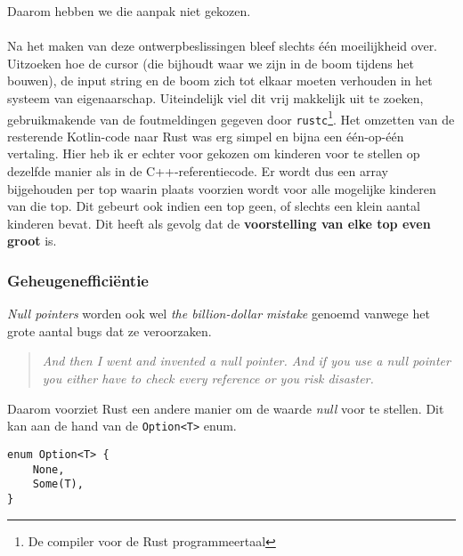 Daarom hebben we die aanpak niet gekozen.
\\ \\
Na het maken van deze ontwerpbeslissingen bleef slechts één moeilijkheid over.
Uitzoeken hoe de cursor (die bijhoudt waar we zijn in de boom tijdens het bouwen), de input string en de boom zich tot elkaar moeten verhouden in het systeem van eigenaarschap.
Uiteindelijk viel dit vrij makkelijk uit te zoeken, gebruikmakende van de foutmeldingen gegeven door \texttt{rustc}\footnote{De compiler voor de Rust programmeertaal}.
Het omzetten van de resterende Kotlin-code naar Rust was erg simpel en bijna een één-op-één vertaling.
Hier heb ik er echter voor gekozen om kinderen voor te stellen op dezelfde manier als in de C++-referentiecode.
Er wordt dus een array bijgehouden per top waarin plaats voorzien wordt voor alle mogelijke kinderen van die top.
Dit gebeurt ook indien een top geen, of slechts een klein aantal kinderen bevat.
Dit heeft als gevolg dat de \textbf{voorstelling van elke top even groot} is.

\subsubsection{Geheugenefficiëntie}
\textit{Null pointers} worden ook wel \textit{the billion-dollar mistake} genoemd vanwege het grote aantal bugs dat ze veroorzaken.
\begin{quote}
    \textit{And then I went and invented a null pointer.
    And if you use a null pointer you either have to check every reference or you risk disaster. \cite{null_mistake}}
\end{quote}
Daarom voorziet Rust een andere manier om de waarde \textit{null} voor te stellen.
Dit kan aan de hand van de \texttt{Option<T>} enum.

\begin{verbatim}
enum Option<T> {
    None,
    Some(T),
}
\end{verbatim}


